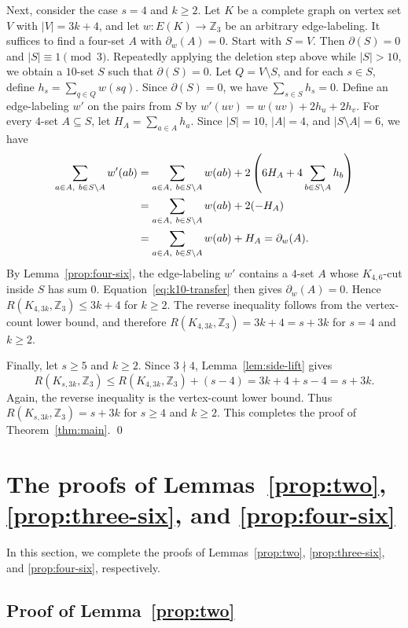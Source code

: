 ﻿\documentclass[11pt]{article}
\numberwithin{equation}{section}
\theoremstyle{remark}
\newcommand{\Z}{\mathbb Z}
\begin{document}
Next, consider the case $s=4$ and $k\ge2$.  Let $K$ be a complete graph on vertex set $V$ with $|V|=3k+4$, and let $w\colon E(K)\to\Z_3$ be an arbitrary edge-labeling.  It suffices to find a four-set $A$ with $\partial_w(A)=0$.  Start with $S=V$.  Then $\partial(S)=0$ and $|S|\equiv1\pmod3$.  Repeatedly applying the deletion step above while $|S|>10$, we obtain a $10$-set $S$ such that $\partial(S)=0$.
Let $Q=V\setminus S$, and for each $s\in S$, define $h_s=\sum_{q\in Q}w(sq)$.  Since $\partial(S)=0$, we have $\sum_{s\in S}h_s=0$.  Define an edge-labeling $w'$ on the pairs from $S$ by $w'(uv)=w(uv)+2h_u+2h_v$.  For every $4$-set $A\subseteq S$, let $H_A=\sum_{a\in A}h_a$.  Since $|S|=10$, $|A|=4$, and $|S\setminus A|=6$, we have
\begin{align}
    \sum_{a\in A,\ b\in S\setminus A}w'(ab)
     & =\sum_{a\in A,\ b\in S\setminus A}w(ab)+2\left(6H_A+4\sum_{b\in S\setminus A}h_b\right)\notag \\
     & =\sum_{a\in A,\ b\in S\setminus A}w(ab)+2(-H_A)\notag                                         \\
     & =\sum_{a\in A,\ b\in S\setminus A}w(ab)+H_A=\partial_w(A).\label{eq:k10-transfer}
\end{align}
By Lemma~\ref{prop:four-six}, the edge-labeling $w'$ contains a $4$-set $A$ whose $K_{4,6}$-cut inside $S$ has sum $0$.  Equation~\eqref{eq:k10-transfer} then gives $\partial_w(A)=0$.  Hence $R(K_{4,3k},\Z_3)\le3k+4$ for $k\ge2$. The reverse inequality follows from the vertex-count lower bound, and therefore $R(K_{4,3k},\Z_3)=3k+4=s+3k$ for $s=4$ and $k\ge2.$

Finally, let $s\ge5$ and $k\ge2$. Since $3\nmid 4$, Lemma~\ref{lem:side-lift} gives
\[
    R(K_{s,3k},\Z_3)\le R(K_{4,3k},\Z_3)+(s-4)=3k+4+s-4=s+3k.
\]
Again, the reverse inequality is the vertex-count lower bound.  Thus $R(K_{s,3k},\Z_3)=s+3k$ for $s\ge4$ and $k\ge2$.
This completes the proof of Theorem~\ref{thm:main}.  \qed

\section{The proofs of Lemmas~\ref{prop:two}, \ref{prop:three-six}, and \ref{prop:four-six}}\label{Sec:pf lemmas}
In this section, we complete the proofs of Lemmas~\ref{prop:two}, \ref{prop:three-six}, and \ref{prop:four-six}, respectively.




\subsection{Proof of Lemma~\ref{prop:two}}\label{subsec:prop2}
\end{document}
